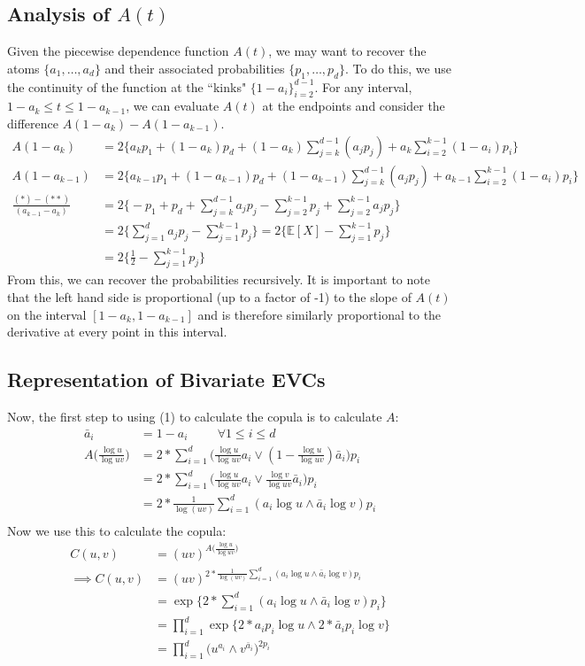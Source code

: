 \documentclass[12pt]{article}
\def\E{\mathbb{E}}
\newcommand{\ds}{\displaystyle}
\theoremstyle{definition}
\theoremstyle{definition}
\begin{document}
\subsection{Analysis of $A(t)$}
Given the piecewise dependence function $A(t)$, we may want to recover the atoms $\{a_1,\hdots,a_d\}$ and their associated probabilities $\{p_1,\hdots,p_d\}$. To do this, we use the continuity of the function at the ``kinks" $\ds \{1-a_i\}_{i=2}^{d-1}$. For any interval, $1-a_k\leq t\leq 1-a_{k-1}$, we can evaluate $A(t)$ at the endpoints and consider the difference $A(1-a_k)-A(1-a_{k-1})$.
\begin{align*}
    A(1-a_k)&=2\bigg\{a_kp_1 + (1-a_k)p_d+ (1-a_k)\sum_{j=k}^{d-1}(a_jp_j)+a_k\sum_{i=2}^{k-1}(1-a_i)p_i\bigg\}\tag{*}\\
    A(1-a_{k-1})&=2\bigg\{a_{k-1}p_1 + (1-a_{k-1})p_d+ (1-a_{k-1})\sum_{j=k}^{d-1}(a_jp_j)+a_{k-1}\sum_{i=2}^{k-1}(1-a_i)p_i\bigg\}\tag{**}\\
    \frac{(*)-(**)}{(a_{k-1}-a_k)}&=2\bigg\{-p_1+p_d +\sum_{j=k}^{d-1}a_jp_j -\sum_{j=2}^{k-1}p_j+\sum_{j=2}^{k-1}a_jp_j\bigg\}\\
    &=2\bigg\{ \sum_{j=1}^da_jp_j -\sum_{j=1}^{k-1}p_j \bigg\}=2\bigg\{ \E[X]-\sum_{j=1}^{k-1}p_j\bigg\}\\
    &=2\bigg\{ \frac{1}{2}-\sum_{j=1}^{k-1}p_j \bigg\}
\end{align*}
From this, we can recover the probabilities recursively. It is important to note that the left hand side is proportional (up to a factor of -1) to the slope of $A(t)$ on the interval $[1-a_k, 1-a_{k-1}]$ and is therefore similarly proportional to the derivative at every point in this interval.
\subsection{Representation of Bivariate EVCs}
Now, 
the first step to using (1) to calculate the copula is to calculate $A$:
\begin{align*}
\bar{a}_i&=1-a_i \hspace{1cm} \forall 1\leq i\leq d\\
    A\big( \frac{\log u}{\log uv} \big)&=2*\sum_{i=1}^d\bigg(\frac{\log u}{\log uv}a_i\vee(1-\frac{\log u}{\log uv})\bar{a}_i\bigg)p_i\\
    &=2*\sum_{i=1}^d\bigg(\frac{\log u}{\log uv}a_i\vee\frac{\log v}{\log uv}\bar{a}_i\bigg)p_i\\
    &=2*\frac{1}{\log(uv)}\sum_{i=1}^d(a_i\log u \wedge \bar{a}_i\log v)p_i\\
\end{align*}
Now we use this to calculate the copula:
\begin{align*}
    C(u,v)&=(uv)^{A\big( \frac{\log u}{\log uv} \big)}\\
    \implies C(u,v)&=(uv)^{2*\frac{1}{\log(uv)}\sum_{i=1}^d(a_i\log u \wedge \bar{a}_i\log v)p_i}\\
    &=\exp\{2*\sum_{i=1}^d(a_i\log u \wedge \bar{a}_i\log v)p_i\}\\
    &=\prod_{i=1}^d\exp\{2*a_ip_i\log u \wedge 2*\bar{a}_ip_i\log v\}\\
    &=\prod_{i=1}^d\bigg(u^{a_i}\wedge v^{\bar{a}_i}\bigg)^{2p_i}
\end{align*}
\end{document}
